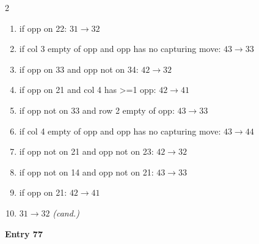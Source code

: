 \begin{multicols}{2}
\begin{tikzpicture}[scale=0.24]
\end{tikzpicture}
\nopagebreak\begin{enumerate}[topsep=1pt,itemsep=0pt,parsep=0pt,leftmargin=2.2em,label=\arabic*.]
\item if opp on 22: $31\!\to\!32$
\item if col 3 empty of opp and opp has no capturing move: $43\!\to\!33$
\item if opp on 33 and opp not on 34: $42\!\to\!32$
\item if opp on 21 and col 4 has >=1 opp: $42\!\to\!41$
\item if opp not on 33 and row 2 empty of opp: $43\!\to\!33$
\item if col 4 empty of opp and opp has no capturing move: $43\!\to\!44$
\item if opp not on 21 and opp not on 23: $42\!\to\!32$
\item if opp not on 14 and opp not on 21: $43\!\to\!33$
\item if opp on 21: $42\!\to\!41$
\item $31\!\to\!32$ \hfill\textit{(cand.)}
\end{enumerate}\smallskip
\noindent\textbf{Entry 77} \; 
\end{multicols}
